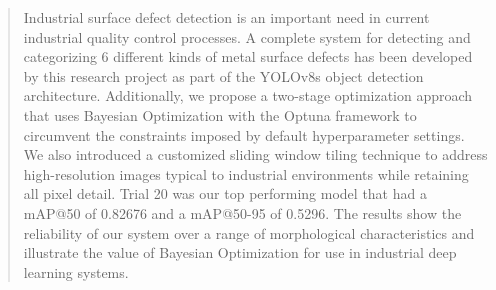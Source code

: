 \documentclass[12pt,a4paper]{report}
\begin{document}
\begin{abstract}
Industrial surface defect detection is an important need in current industrial quality control processes. A complete system for detecting and categorizing 6 different kinds of metal surface defects has been developed by this research project as part of the YOLOv8s object detection architecture. Additionally, we propose a two-stage optimization approach that uses Bayesian Optimization with the Optuna framework to circumvent the constraints imposed by default hyperparameter settings. We also introduced a customized sliding window tiling technique to address high-resolution images typical to industrial environments while retaining all pixel detail. Trial 20 was our top performing model that had a mAP@50 of 0.82676 and a mAP@50-95 of 0.5296. The results show the reliability of our system over a range of morphological characteristics and illustrate the value of Bayesian Optimization for use in industrial deep learning systems.
\end{abstract}
\newpage
\tableofcontents
\newpage



\newpage


\newpage


\newpage


\newpage


\newpage


\newpage


\newpage


\newpage











\end{document}
